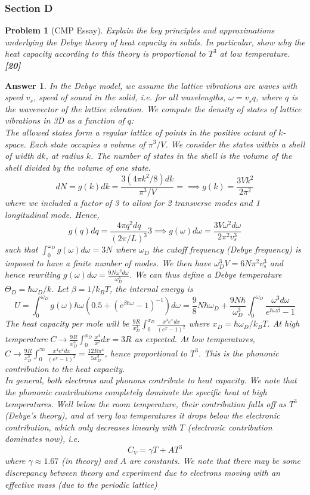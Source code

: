 \documentclass[a4paper]{article}
\newtheorem{ans}{Answer}[subsection]
\theoremstyle{new}
\newtheorem{qns}{Problem}[subsection]
\begin{document}
\subsubsection{Section D}
\begin{qns}[CMP Essay]
Explain the key principles and approximations underlying the Debye theory of heat capacity in solids. In particular, show why the heat capacity according to this theory is proportional to $T^3$ at low temperature.\hfill\textbf{[20]}
\end{qns}
\begin{ans}
In the Debye model, we assume the lattice vibrations are waves with speed $v_s$, speed of sound in the solid, i.e. for all wavelengths, $\omega=v_sq$, where $q$ is the wavevector of the lattice vibration. We compute the density of states of lattice vibrations in 3D as a function of $q$:\\[5pt]
The allowed states form a regular lattice of points in the positive octant of $k$-space. Each state occupies a volume of $\pi^3/V$. We consider the states within a shell of width $dk$, at radius $k$. The number of states in the shell is the volume of the shell divided by the volume of one state.
$$dN=g(k)dk=\frac{3(4\pi k^2/8)dk}{\pi^3/V}=\implies g(k)=\frac{3Vk^2}{2\pi^2}$$
where we included a factor of 3 to allow for 2 transverse modes and 1 longitudinal mode. Hence,
$$g(q)dq=\frac{4\pi q^2dq}{(2\pi/L)^3}3\implies g(\omega)d\omega=\frac{3V\omega^2d\omega}{2\pi^2v_s^3}$$
such that $\int_0^{\omega_D}g(\omega)d\omega=3N$ where $\omega_D$ the cutoff frequency (Debye frequency) is imposed to have a finite number of modes. We then have $\omega_D^3V=6N\pi^2v_s^3$ and hence rewriting $g(\omega)d\omega=\frac{9N\omega^2d\omega}{\omega_D^3}$. We can thus define a Debye temperature $\Theta_D=\hbar\omega_D/k$. Let $\beta=1/k_BT$, the internal energy is 
$$U=\int_0^{\omega_D}g(\omega)\hbar\omega(0.5+(e^{\beta\hbar\omega}-1)^{-1})d\omega=\frac{9}{8}N\hbar\omega_D+\frac{9N\hbar}{\omega_D^3}\int_0^{\omega_D}\frac{\omega^3d\omega}{e^{\hbar\omega\beta}-1}$$
The heat capacity per mole will be $\frac{9R}{x_D^3}\int_0^{x_D}\frac{x^4e^xdx}{(e^x-1)^2}$ where $x_D=\hbar\omega_D/k_BT$. At high temperature $C\rightarrow\frac{9R}{x_D^3}\int_0^{x_D}\frac{x^4}{x^2}dx=3R$ as expected. At low temperatures, $C\rightarrow\frac{9R}{x_D^3}\int_0^\infty\frac{x^4e^xdx}{(e^x-1)^2}=\frac{12R\pi^4}{5x_D^3}$, hence proportional to $T^3$. This is the phononic contribution to the heat capacity.\\[5pt]
In general, both electrons and phonons contribute to heat capacity. We note that the phononic contributions completely dominate the specific heat at high temperatures. Well below the room temperature, their contribution falls off as $T^3$ (Debye's theory), and at very low temperatures it drops below the electronic contribution, which only decreases linearly with $T$ (electronic contribution dominates now), i.e. 
$$C_V=\gamma T+AT^3$$
where $\gamma\approx 1.67$ (in theory) and $A$ are constants. We note that there may be some discrepancy between theory and experiment due to electrons moving with an effective mass (due to the periodic lattice)
\end{ans}
\end{document}
